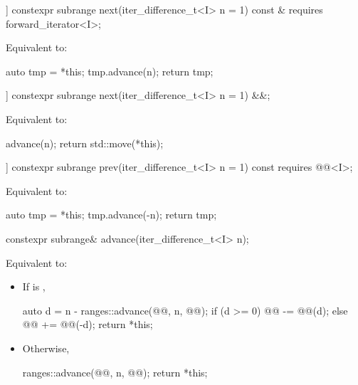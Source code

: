 %
\begin{itemdecl}
[[nodiscard]] constexpr subrange next(iter_difference_t<I> n = 1) const &
  requires forward_iterator<I>;
\end{itemdecl}

\begin{itemdescr}
\pnum
\effects
Equivalent to:
\begin{codeblock}
auto tmp = *this;
tmp.advance(n);
return tmp;
\end{codeblock}
\end{itemdescr}

%
\begin{itemdecl}
[[nodiscard]] constexpr subrange next(iter_difference_t<I> n = 1) &&;
\end{itemdecl}

\begin{itemdescr}
\pnum
\effects
Equivalent to:
\begin{codeblock}
advance(n);
return std::move(*this);
\end{codeblock}
\end{itemdescr}

%
\begin{itemdecl}
[[nodiscard]] constexpr subrange prev(iter_difference_t<I> n = 1) const
  requires @@<I>;
\end{itemdecl}

\begin{itemdescr}
\pnum
\effects
Equivalent to:
\begin{codeblock}
auto tmp = *this;
tmp.advance(-n);
return tmp;
\end{codeblock}
\end{itemdescr}

%
\begin{itemdecl}
constexpr subrange& advance(iter_difference_t<I> n);
\end{itemdecl}

\begin{itemdescr}
\pnum
\effects
Equivalent to:
\begin{itemize}
\item If  is ,
\begin{codeblock}
auto d = n - ranges::advance(@@, n, @@);
if (d >= 0)
  @@ -= @@(d);
else
  @@ += @@(-d);
return *this;
\end{codeblock}
\item Otherwise,
\begin{codeblock}
ranges::advance(@@, n, @@);
return *this;
\end{codeblock}
\end{itemize}
\end{itemdescr}

